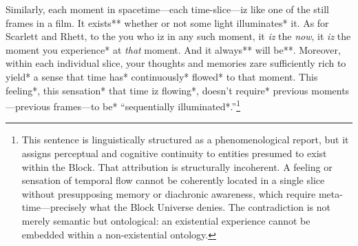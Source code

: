 \documentclass[12pt]{book}
\begin{document}
Similarly, each moment in spacetime---each time-slice---iz like one of the still frames in a film. It exists** whether or not some light illuminates* it. As for Scarlett and Rhett, to the you who iz in any such moment, it \textit{iz} the \textit{now}, it \textit{iz} the moment you experience* at \textit{that} moment. And it always** will be**. Moreover, within each individual slice, your thoughts and memories zare sufficiently rich to yield* a sense that time has* continuously* flowed* to that moment. This feeling*, this sensation* that time iz flowing*, doesn't require* previous moments---previous frames---to be* ``sequentially illuminated*.''\footnote{This sentence is linguistically structured as a phenomenological report, but it assigns perceptual and cognitive continuity to entities presumed to exist within the Block. That attribution is structurally incoherent. A feeling or sensation of temporal flow cannot be coherently located in a single slice without presupposing memory or diachronic awareness, which require meta-time---precisely what the Block Universe denies. The contradiction is not merely semantic but ontological: an existential experience cannot be embedded within a non-existential ontology.}

\vspace{1em}
\vspace{1em}
\end{document}
